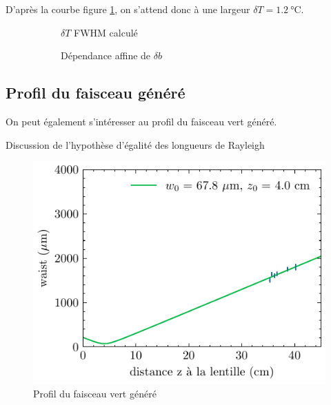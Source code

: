 \documentclass[11pt,a4paper] { article}
\newcommand{\zr}{z_\mathsc{R}}
\newcommand{\mathsc}[1]{\mathrm{\scriptscriptstyle {#1}}}
\begin{document}
D'après la courbe figure \ref{fig:fwhm}, on s'attend donc à une largeur $\delta T = \SI{1.2}{\celsius}$.



\begin{figure}[htpb] 
\centering
\hspace*{-0.8cm}
\begin{subfigure}[b]{0.48\textwidth}
	\small
	
	\caption{$\delta T$ FWHM calculé}
	\label{fig:fwhm}
\end{subfigure}
\hspace{0.2cm}
\begin{subfigure}[b]{0.48\textwidth}
	\small
	
	\caption{Dépendance affine de $\delta b$}
	\label{fig:baff}
\end{subfigure}
\hspace{0.8cm}
\caption{}
\end{figure}


\subsection{Profil du faisceau généré}

On peut également s'intéresser au profil du faisceau vert généré.

Discussion de l'hypothèse d'égalité des longueurs de Rayleigh

\begin{figure}[h]
	\centering
	\includegraphics{./img/waist faisceau vert.pdf}
	\caption{Profil du faisceau vert généré}
	\label{fig:vert}
\end{figure}
\end{document}
